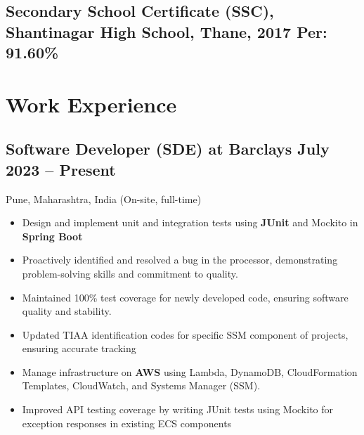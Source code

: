 \documentclass[a4,10pt]{article}
\newcommand{\subtext}[1]{
#1\par\vspace{-0.2cm}}
\newenvironment{zitemize}{
\begin{itemize}\itemsep0pt \parskip0pt \parsep1pt}
{\end{itemize}\vspace{-0.5cm}}
\begin{document}
\subsection*{Secondary School Certificate (SSC), {\normalsize \normalfont Shantinagar High School, Thane, 2017}  \hfill Per: 91.60\%} 
\vspace{0.2cm}


\section{Work Experience}

        

\subsection*{Software Developer (SDE) at Barclays \hfill July 2023 -- Present} 
\subtext{Pune, Maharashtra, India {\normalsize\normalfont (On-site, full-time) }} 
    \begin{zitemize}
        \item Design and implement unit and integration tests using \textbf{JUnit} and Mockito in \textbf{Spring Boot}
        \item Proactively identified and resolved a bug in the processor, demonstrating problem-solving skills and commitment to quality.
        \item Maintained 100\% test coverage for newly developed code, ensuring software quality and stability.
        \item Updated TIAA identification codes for specific SSM component of projects, ensuring accurate tracking
        \item Manage infrastructure on \textbf{AWS} using Lambda, DynamoDB, CloudFormation Templates, CloudWatch, and Systems Manager (SSM).
        \item Improved API testing coverage by writing JUnit tests using Mockito for exception responses in existing ECS components
    \end{zitemize}
\end{document}
